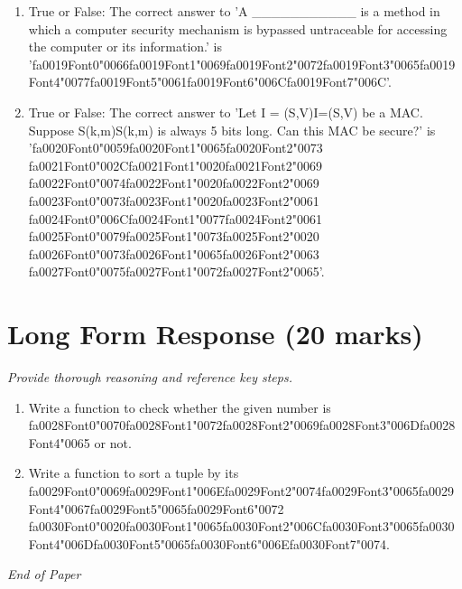 \documentclass[12pt]{article}
\begin{document}
\begin{enumerate}[label=\arabic*.]
\item True or False: The correct answer to 'A \_\_\_\_\_\_\_\_\_\_\_ is a method in which a computer security mechanism is bypassed untraceable for accessing the computer or its information.' is '{\csname fa0019Font0\endcsname\char"0066}{\csname fa0019Font1\endcsname\char"0069}{\csname fa0019Font2\endcsname\char"0072}{\csname fa0019Font3\endcsname\char"0065}{\csname fa0019Font4\endcsname\char"0077}{\csname fa0019Font5\endcsname\char"0061}{\csname fa0019Font6\endcsname\char"006C}{\csname fa0019Font7\endcsname\char"006C}'.
\item True or False: The correct answer to 'Let I = (S,V)I=(S,V) be a MAC. Suppose S(k,m)S(k,m) is always 5 bits long. Can this MAC be secure?' is '{\csname fa0020Font0\endcsname\char"0059}{\csname fa0020Font1\endcsname\char"0065}{\csname fa0020Font2\endcsname\char"0073} {\csname fa0021Font0\endcsname\char"002C}{\csname fa0021Font1\endcsname\char"0020}{\csname fa0021Font2\endcsname\char"0069} {\csname fa0022Font0\endcsname\char"0074}{\csname fa0022Font1\endcsname\char"0020}{\csname fa0022Font2\endcsname\char"0069} {\csname fa0023Font0\endcsname\char"0073}{\csname fa0023Font1\endcsname\char"0020}{\csname fa0023Font2\endcsname\char"0061} {\csname fa0024Font0\endcsname\char"006C}{\csname fa0024Font1\endcsname\char"0077}{\csname fa0024Font2\endcsname\char"0061} {\csname fa0025Font0\endcsname\char"0079}{\csname fa0025Font1\endcsname\char"0073}{\csname fa0025Font2\endcsname\char"0020} {\csname fa0026Font0\endcsname\char"0073}{\csname fa0026Font1\endcsname\char"0065}{\csname fa0026Font2\endcsname\char"0063} {\csname fa0027Font0\endcsname\char"0075}{\csname fa0027Font1\endcsname\char"0072}{\csname fa0027Font2\endcsname\char"0065}'.
\end{enumerate}

\section*{Long Form Response (20 marks)}
\textit{Provide thorough reasoning and reference key steps.}
\begin{enumerate}[label=\arabic*.]
\item Write a function to check whether the given number is {\csname fa0028Font0\endcsname\char"0070}{\csname fa0028Font1\endcsname\char"0072}{\csname fa0028Font2\endcsname\char"0069}{\csname fa0028Font3\endcsname\char"006D}{\csname fa0028Font4\endcsname\char"0065} or not.
\item Write a function to sort a tuple by its {\csname fa0029Font0\endcsname\char"0069}{\csname fa0029Font1\endcsname\char"006E}{\csname fa0029Font2\endcsname\char"0074}{\csname fa0029Font3\endcsname\char"0065}{\csname fa0029Font4\endcsname\char"0067}{\csname fa0029Font5\endcsname\char"0065}{\csname fa0029Font6\endcsname\char"0072} {\csname fa0030Font0\endcsname\char"0020}{\csname fa0030Font1\endcsname\char"0065}{\csname fa0030Font2\endcsname\char"006C}{\csname fa0030Font3\endcsname\char"0065}{\csname fa0030Font4\endcsname\char"006D}{\csname fa0030Font5\endcsname\char"0065}{\csname fa0030Font6\endcsname\char"006E}{\csname fa0030Font7\endcsname\char"0074}.
\end{enumerate}

\vfill
\noindent\textit{End of Paper}
\end{document}
